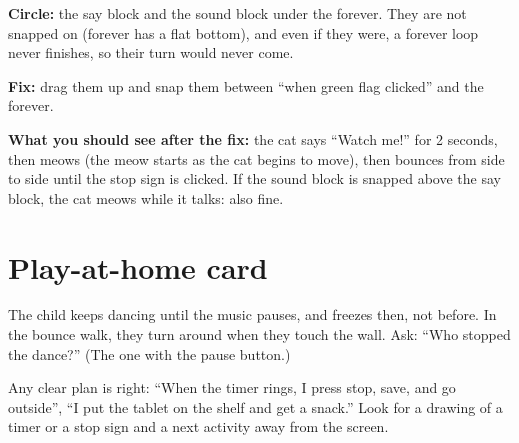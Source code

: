 \begin{answer}
\textbf{Circle:} the say block and the sound block under the forever. They are not snapped on (forever has a flat bottom), and even if they were, a forever loop never finishes, so their turn would never come.

\textbf{Fix:} drag them up and snap them between \enquote{when green flag clicked} and the forever.

\textbf{What you should see after the fix:} the cat says \enquote{Watch me!} for 2 seconds, then meows (the meow starts as the cat begins to move), then bounces from side to side until the stop sign is clicked. If the sound block is snapped above the say block, the cat meows while it talks: also fine.
\end{answer}

\section{Play-at-home card}
\begin{answer}
The child keeps dancing until the music pauses, and freezes then, not before. In the bounce walk, they turn around when they touch the wall. Ask: \enquote{Who stopped the dance?} (The one with the pause button.)
\end{answer}

\begin{answer}
Any clear plan is right: \enquote{When the timer rings, I press stop, save, and go outside}, \enquote{I put the tablet on the shelf and get a snack.} Look for a drawing of a timer or a stop sign and a next activity away from the screen.
\end{answer}
